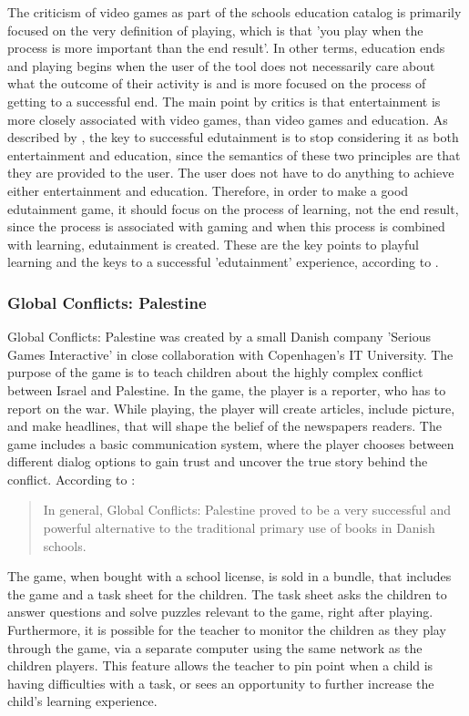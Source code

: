 The criticism of video games as part of the schools education catalog is primarily focused on the very definition of playing, which is that 'you play when the process is more important than the end result'.
In other terms, education ends and playing begins when the user of the tool does not necessarily care about what the outcome of their activity is and is more focused on the process of getting to a successful end.
The main point by critics is that entertainment is more closely associated with video games, than video games and education.
As described by \citep{edunoty}, the key to successful edutainment is to stop considering it as both entertainment and education, since the semantics of these two principles are that they are provided to the user.
The user does not have to do anything to achieve either entertainment and education.
Therefore, in order to make a good edutainment game, it should focus on the process of learning, not the end result, since the process is associated with gaming and when this process is combined with learning, edutainment is created.
These are the key points to playful learning and the keys to a successful 'edutainment' experience, according to \cite{edunoty}.

\subsubsection{Global Conflicts: Palestine}

Global Conflicts: Palestine was created by a small Danish company 'Serious Games Interactive' in close collaboration with Copenhagen's IT University.
The purpose of the game is to teach children about the highly complex conflict between Israel and Palestine.
In the game, the player is a reporter, who has to report on the war.
While playing, the player will create articles, include picture, and make headlines, that will shape the belief of the newspapers readers.
The game includes a basic communication system, where the player chooses between different dialog options to gain trust and uncover the true story behind the conflict. According to \cite{laeringpaaspil}:
\begin{quote}
	In general, Global Conflicts: Palestine proved to be a very successful and powerful alternative to the traditional primary use of books in Danish schools.
\end{quote}
The game, when bought with a school license, is sold in a bundle, that includes the game and a task sheet for the children.
The task sheet asks the children to answer questions and solve puzzles relevant to the game, right after playing.
Furthermore, it is possible for the teacher to monitor the children as they play through the game, via a separate computer using the same network as the children players.
This feature allows the teacher to pin point when a child is having difficulties with a task, or sees an opportunity to further increase the child's learning experience.\newline

